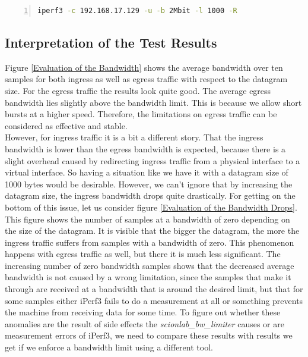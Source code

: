\begin{lstlisting}[language=sh, caption = Example Ingress Test Command, captionpos=b, numbers=left, frame=single, breaklines=true, breakatwhitespace=true, showstringspaces=false, label=Example Ingress Test Command]
iperf3 -c 192.168.17.129 -u -b 2Mbit -l 1000 -R
\end{lstlisting}

\subsection{Interpretation of the Test Results}

Figure \ref{Evaluation of the Bandwidth} shows the average bandwidth over ten samples for both ingress as well as egress traffic with respect to the datagram size. For the egress traffic the results look quite good. The average egress bandwidth lies slightly above the bandwidth limit. This is because we allow short bursts at a higher speed. Therefore, the limitations on egress traffic can be considered as effective and stable.
\\
However, for ingress traffic it is a bit a different story. That the ingress bandwidth is lower than the egress bandwidth is expected, because there is a slight overhead caused by redirecting ingress traffic from a physical interface to a virtual interface. So having a situation like we have it with a datagram size of 1000 bytes would be desirable. However, we can't ignore that by increasing the datagram size, the ingress bandwidth drops quite drastically. For getting on the bottom of this issue, let us consider figure \ref{Evaluation of the Bandwidth Drops}. This figure shows the number of samples at a bandwidth of zero depending on the size of the datagram. It is visible that the bigger the datagram, the more the ingress traffic suffers from samples with a bandwidth of zero. This phenomenon happens with egress traffic as well, but there it is much less significant. The increasing number of zero bandwidth samples shows that the decreased average bandwidth is not caused by a wrong limitation, since the samples that make it through are received at a bandwidth that is around the desired limit, but that for some samples either iPerf3 fails to do a measurement at all or something prevents the machine from receiving data for some time. To figure out whether these anomalies are the result of side effects the \textit{scionlab\_bw\_limiter} causes or are measurement errors of iPerf3, we need to compare these results with results we get if we enforce a bandwidth limit using a different tool.

